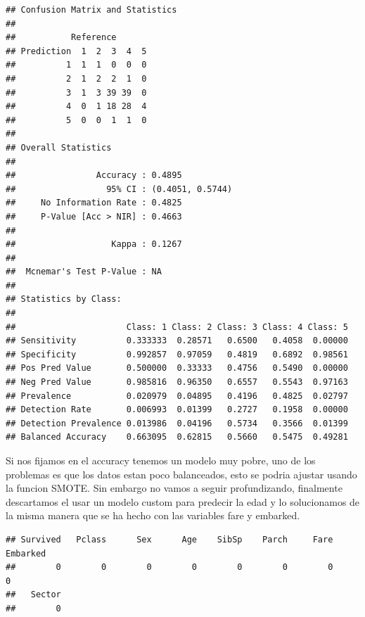 \documentclass[
]{article}
\newenvironment{Shaded}{\begin{snugshade}}{\end{snugshade}}
\newcommand{\KeywordTok}[1]{\textcolor[rgb]{0.94,0.87,0.69}{#1}}
\newcommand{\NormalTok}[1]{\textcolor[rgb]{0.80,0.80,0.80}{#1}}
\newcommand{\OperatorTok}[1]{\textcolor[rgb]{0.94,0.94,0.82}{#1}}
\newcommand{\StringTok}[1]{\textcolor[rgb]{0.80,0.58,0.58}{#1}}
\begin{document}
\begin{verbatim}
## Confusion Matrix and Statistics
## 
##           Reference
## Prediction  1  2  3  4  5
##          1  1  1  0  0  0
##          2  1  2  2  1  0
##          3  1  3 39 39  0
##          4  0  1 18 28  4
##          5  0  0  1  1  0
## 
## Overall Statistics
##                                           
##                Accuracy : 0.4895          
##                  95% CI : (0.4051, 0.5744)
##     No Information Rate : 0.4825          
##     P-Value [Acc > NIR] : 0.4663          
##                                           
##                   Kappa : 0.1267          
##                                           
##  Mcnemar's Test P-Value : NA              
## 
## Statistics by Class:
## 
##                      Class: 1 Class: 2 Class: 3 Class: 4 Class: 5
## Sensitivity          0.333333  0.28571   0.6500   0.4058  0.00000
## Specificity          0.992857  0.97059   0.4819   0.6892  0.98561
## Pos Pred Value       0.500000  0.33333   0.4756   0.5490  0.00000
## Neg Pred Value       0.985816  0.96350   0.6557   0.5543  0.97163
## Prevalence           0.020979  0.04895   0.4196   0.4825  0.02797
## Detection Rate       0.006993  0.01399   0.2727   0.1958  0.00000
## Detection Prevalence 0.013986  0.04196   0.5734   0.3566  0.01399
## Balanced Accuracy    0.663095  0.62815   0.5660   0.5475  0.49281
\end{verbatim}

Si nos fijamos en el accuracy tenemos un modelo muy pobre, uno de los
problemas es que los datos estan poco balanceados, esto se podria
ajustar usando la funcion SMOTE. Sin embargo no vamos a seguir
profundizando, finalmente descartamos el usar un modelo custom para
predecir la edad y lo solucionamos de la misma manera que se ha hecho
con las variables fare y embarked.

\begin{Shaded}
\end{Shaded}

\begin{verbatim}
## Survived   Pclass      Sex      Age    SibSp    Parch     Fare Embarked 
##        0        0        0        0        0        0        0        0 
##   Sector 
##        0
\end{verbatim}
\end{document}
